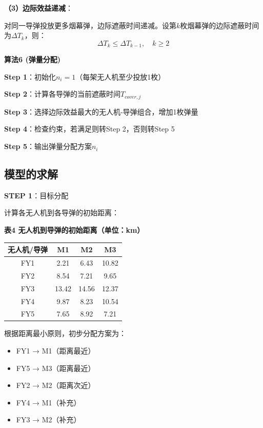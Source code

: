 \documentclass[12pt,a4paper]{article}
\begin{document}
\noindent\textbf{（3）边际效益递减}：

\indent 对同一导弹投放更多烟幕弹，边际遮蔽时间递减。设第$k$枚烟幕弹的边际遮蔽时间为$\Delta T_k$，则：
\begin{equation}
\Delta T_k \leq \Delta T_{k-1}, \quad k \geq 2
\end{equation}

\noindent\textbf{算法6 (弹量分配)}

\indent \textbf{Step 1}：初始化$n_i = 1$（每架无人机至少投放1枚）

\indent \textbf{Step 2}：计算各导弹的当前遮蔽时间$T_{cover,j}$

\indent \textbf{Step 3}：选择边际效益最大的无人机-导弹组合，增加1枚弹量

\indent \textbf{Step 4}：检查约束，若满足则转Step 2，否则转Step 5

\indent \textbf{Step 5}：输出弹量分配方案$n_i$

\subsection{模型的求解}

\noindent\textbf{STEP 1}：目标分配

\indent 计算各无人机到各导弹的初始距离：

\noindent\textbf{表4 无人机到导弹的初始距离（单位：km）}

\begin{table}[H]
\centering
\begin{tabular}{cccc}
\toprule
\textbf{无人机/导弹} & \textbf{M1} & \textbf{M2} & \textbf{M3} \\
\midrule
FY1 & 2.21 & 6.43 & 10.82 \\
FY2 & 8.54 & 7.21 & 9.65 \\
FY3 & 13.42 & 14.56 & 12.37 \\
FY4 & 9.87 & 8.23 & 10.54 \\
FY5 & 7.65 & 8.92 & 7.21 \\
\bottomrule
\end{tabular}
\end{table}

\indent 根据距离最小原则，初步分配方案为：
\begin{itemize}
\item FY1 → M1（距离最近）
\item FY5 → M3（距离最近）
\item FY2 → M2（距离次近）
\item FY4 → M1（补充）
\item FY3 → M2（补充）
\end{itemize}
\end{document}
